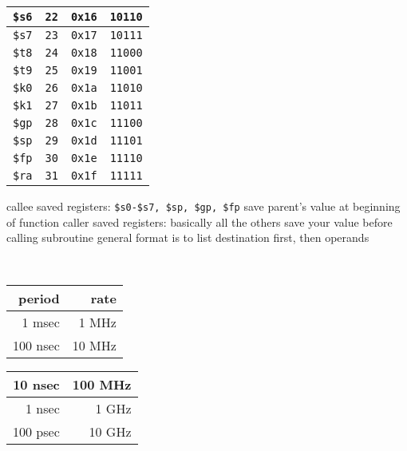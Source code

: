 \documentclass[12pt]{article}
\begin{document}
\begin{spacing}{0.8}
\begin{multicols*}{2}
\begin{flushleft}
\begin{outline}[longenum]
\begin{tabular}{|l r l l|}
  \verb|$s6| & \verb|22| & \verb|0x16| & \verb|10110| \\ \hline
  \verb|$s7| & \verb|23| & \verb|0x17| & \verb|10111| \\ \hline \hline
  \verb|$t8| & \verb|24| & \verb|0x18| & \verb|11000| \\ \hline
  \verb|$t9| & \verb|25| & \verb|0x19| & \verb|11001| \\ \hline \hline
  \verb|$k0| & \verb|26| & \verb|0x1a| & \verb|11010| \\ \hline
  \verb|$k1| & \verb|27| & \verb|0x1b| & \verb|11011| \\ \hline
  \verb|$gp| & \verb|28| & \verb|0x1c| & \verb|11100| \\ \hline
  \verb|$sp| & \verb|29| & \verb|0x1d| & \verb|11101| \\ \hline
  \verb|$fp| & \verb|30| & \verb|0x1e| & \verb|11110| \\ \hline
  \verb|$ra| & \verb|31| & \verb|0x1f| & \verb|11111| \\ \hline
  \end{tabular}
  \1 callee saved registers: \verb|$s0-$s7, $sp, $gp, $fp|
    \2 save parent's value at beginning of function
  \1 caller saved registers: basically all the others
    \2 save your value before calling subroutine
  \1 general format is to list destination first, then operands

\\
\begin{tabular}{|r r|}    \hline
  period   & rate    \\ \hline
    1 msec &   1 MHz \\ \hline
  100 nsec &  10 MHz \\ \hline
\end{tabular}
\begin{tabular}{|r r|}    \hline
   10 nsec & 100 MHz \\ \hline
    1 nsec & 1 GHz   \\ \hline
  100 psec & 10 GHz   \\ \hline
\end{tabular}


\end{outline}
\end{flushleft}
\end{multicols*}
\end{spacing}
\end{document}
